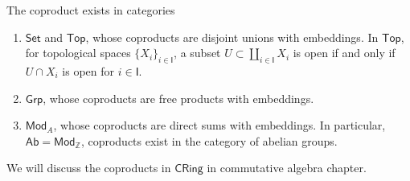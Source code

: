 \begin{prop}
    The coproduct exists in categories
    \begin{enumerate}[(1)]
        \item $\mathsf{Set}$ and $\mathsf{Top}$, whose coproducts are disjoint unions with embeddings.
        In $\mathsf{Top}$, for topological spaces $\{X_i\}_{i\in\mathsf{I}}$, a subset $U\subset\coprod_{i\in\mathsf{I}}X_i$ is open if and only if $U\cap X_i$ is open for $i\in\mathsf{I}$.
        \item $\mathsf{Grp}$, whose coproducts are free products with embeddings.
        \item $\mathsf{Mod}_A$, whose coproducts are direct sums with embeddings.
        In particular, $\mathsf{Ab}=\mathsf{Mod}_\mathbb{Z}$, coproducts exist in the category of abelian groups.
    \end{enumerate}
\end{prop}

\begin{rem}\label{need ref 1}
    We will discuss the coproducts in $\mathsf{CRing}$ in commutative algebra chapter. %
\end{rem}